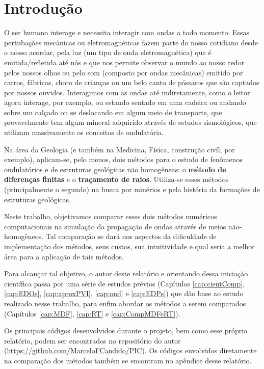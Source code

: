 \chapter{Introdução}

    O ser humano interage e necessita interagir com ondas a todo momento. Essas pertubações mecânicas ou eletromagnéticas fazem parte do nosso cotidiano desde o nosso acordar, pela luz (um tipo de onda eletromagnética) que é emitida/refletida até nós e que nos permite observar o mundo ao nosso redor pelos nossos olhos ou pelo som (composto por ondas mecânicas) emitido por carros, fábricas, choro de crianças ou um belo canto de pássaros que são captados por nossos ouvidos. Interagimos com as ondas até indiretamente, como o leitor agora interage, por exemplo, ou estando sentado em uma cadeira ou andando sobre um calçado ou se deslocando em algum meio de transporte, que provavelmente tem algum mineral adquirido através de estudos sismológicos, que utilizam massivamente os conceitos de ondulatória.
    
    Na área da Geologia (e também na Medicina, Física, construção civíl, por exemplo), aplicam-se, pelo menos, dois métodos para o estudo de fenômenos ondulatórios e de estruturas geológicas não homogêneas: o \textbf{método de diferenças finitas} e o \textbf{traçamento de raios}. Utiliza-se esses métodos (principalmente o segundo) na busca por minérios e pela história da formações de estruturas geológicas.
    
    Neste trabalho, objetivamos comparar esses dois métodos numéricos computacionais na simulação da propagação de ondas através de meios não-homogêneos. Tal comparação se dará nos aspectos da dificuldade de implementação dos métodos, seus custos, sua intuitividade e qual seria a melhor área para a aplicação de tais métodos.
    
    Para alcançar tal objetivo, o autor deste relatório e orientando dessa iniciação científica passa por uma série de estudos prévios (Capítulos \ref{cap:cientComp}, \ref{cap:EDOs}, \ref{cap:aproxPVI}, \ref{cap:ond} e \ref{cap:EDPs}) que dão base ao estudo realizado nesse trabalho, para enfim abordar os métodos a serem comparados (Capítulos \ref{cap:MDF}, \ref{cap:RT} e \ref{cap:CompMDFeRT}).
    
    Os principais códigos desenvolvidos durante o projeto, bem como esse próprio relatório, podem ser encontrados no repositório do autor (\url{https://github.com/MarceloFCandido/PIC}). Os códigos envolvidos diretamente na comparação dos métodos também se encontram no apêndice desse relatório.